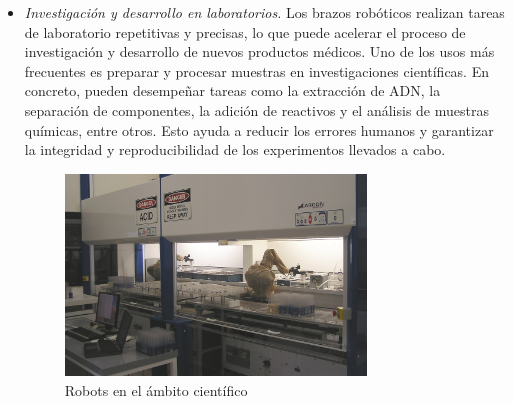 \begin{itemize}
  \item \textit{Investigación y desarrollo en laboratorios.} Los brazos robóticos realizan tareas de laboratorio repetitivas y precisas, 
                              lo que puede acelerar el proceso de investigación y desarrollo de nuevos productos médicos. Uno de los usos más 
                              frecuentes es preparar y procesar muestras en investigaciones científicas. En concreto, pueden desempeñar tareas
                              como la extracción de ADN, la separación de componentes, la adición de reactivos y el análisis de muestras 
                              químicas, entre otros. Esto ayuda a reducir los errores humanos y garantizar la integridad y reproducibilidad 
                              de los experimentos llevados a cabo.
  
  \begin{figure} [h!]
    \begin{center}
      \includegraphics[width=8cm]{figs/lab_robot.jpg}
    \end{center}
    \caption{Robots en el ámbito científico}
    \label{fig:robLaboratory}
  \end{figure}\ 

 \end{itemize}\



